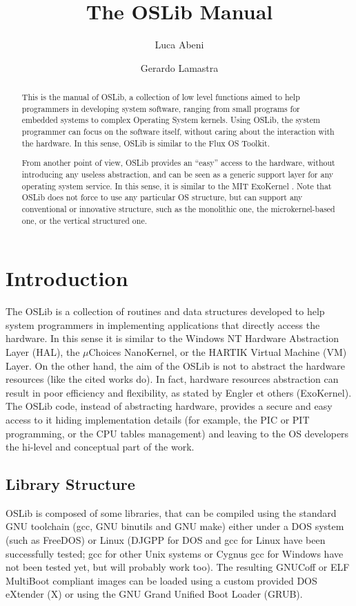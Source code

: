 \documentclass[a4paper]{report}
\title{The OSLib Manual}
\author{Luca Abeni
\and
	Gerardo Lamastra
}
\begin{document}
\setlength{\baselineskip}{1.5\baselineskip}
\maketitle
\begin{abstract}
This is the manual of OSLib, a collection of low level functions aimed
to help programmers in developing system software, ranging from small
programs for embedded systems to complex Operating System
kernels. Using OSLib, the system programmer can focus on the software
itself, without caring about the interaction with the hardware.  In
this sense, OSLib is similar to the Flux OS Toolkit.

From another point of view, OSLib provides an ``easy'' access to the
hardware, without introducing any useless abstraction, and can be seen
as a generic support layer for any operating system service. In this
sense, it is similar to the MIT ExoKernel .  Note that OSLib does not
force to use any particular OS structure, but can support any
conventional or innovative structure, such as the monolithic one, the
microkernel-based one, or the vertical structured one.
\end{abstract}

\chapter{Introduction}
The OSLib is a collection of routines and data structures developed
to help system programmers in implementing applications that
directly access the hardware. In this sense it is
similar to the Windows NT Hardware Abstraction Layer (HAL), the
$\mu$Choices NanoKernel, or the HARTIK Virtual Machine (VM) Layer. On
the other hand, the aim of the OSLib is not to abstract the
hardware resources (like the cited works do).  In fact, hardware
resources abstraction can result in poor efficiency and flexibility,
as stated by Engler et others (ExoKernel). The OSLib code, instead of
abstracting hardware, provides a secure and easy access to it hiding
implementation details (for example, the PIC or PIT programming, or the
CPU tables management)
and leaving to the OS developers the hi-level and conceptual part of
the work.

\section{Library Structure}
OSLib is composed of some libraries, that can be compiled using
the standard GNU toolchain (gcc, GNU binutils and GNU make) either under
a DOS system (such as FreeDOS) or Linux (DJGPP for DOS and
gcc for Linux have been successfully tested; gcc for other Unix
systems or Cygnus gcc for Windows have not been tested yet, but
will probably work too). The resulting GNUCoff or ELF MultiBoot compliant
images can be loaded using a custom provided DOS eXtender (X) or
using the GNU Grand Unified Boot Loader (GRUB).
\end{document}
